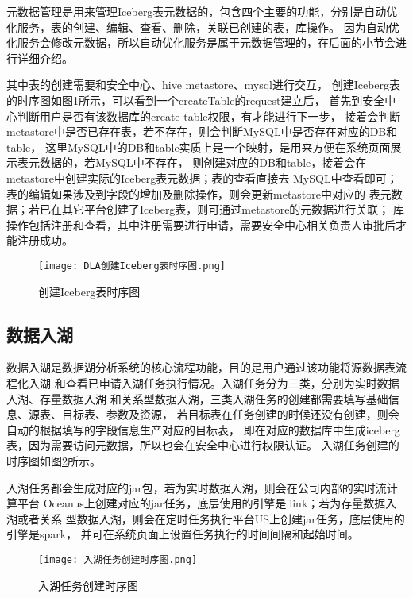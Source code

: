 元数据管理是用来管理Iceberg表元数据的，包含四个主要的功能，分别是自动优化服务，表的创建、编辑、查看、删除，关联已创建的表，库操作。
因为自动优化服务会修改元数据，所以自动优化服务是属于元数据管理的，在后面的小节会进行详细介绍。

其中表的创建需要和安全中心、hive metastore、mysql进行交互，
创建Iceberg表的时序图如图\ref{fig:创建Iceberg表时序图}所示，可以看到一个createTable的request建立后，
首先到安全中心判断用户是否有该数据库的create table权限，有才能进行下一步，
接着会判断metastore中是否已存在表，若不存在，则会判断MySQL中是否存在对应的DB和table，
这里MySQL中的DB和table实质上是一个映射，是用来方便在系统页面展示表元数据的，若MySQL中不存在，
则创建对应的DB和table，接着会在metastore中创建实际的Iceberg表元数据；表的查看直接去
MySQL中查看即可；表的编辑如果涉及到字段的增加及删除操作，则会更新metastore中对应的
表元数据；若已在其它平台创建了Iceberg表，则可通过metastore的元数据进行关联；
库操作包括注册和查看，其中注册需要进行申请，需要安全中心相关负责人审批后才能注册成功。

\begin{figure}[H]
  \centering
  \texttt{[image: DLA创建Iceberg表时序图.png]}
  \caption{创建Iceberg表时序图}
  \label{fig:创建Iceberg表时序图}
\end{figure}

\subsection{数据入湖}

数据入湖是数据湖分析系统的核心流程功能，目的是用户通过该功能将源数据表流程化入湖
和查看已申请入湖任务执行情况。入湖任务分为三类，分别为实时数据入湖、存量数据入湖
和关系型数据入湖，三类入湖任务的创建都需要填写基础信息、源表、目标表、参数及资源，
若目标表在任务创建的时候还没有创建，则会自动的根据填写的字段信息生产对应的目标表，
即在对应的数据库中生成iceberg表，因为需要访问元数据，所以也会在安全中心进行权限认证。
入湖任务创建的时序图如图\ref{fig:入湖任务创建时序图}所示。

入湖任务都会生成对应的jar包，若为实时数据入湖，则会在公司内部的实时流计算平台
Oceanus上创建对应的jar任务，底层使用的引擎是flink；若为存量数据入湖或者关系
型数据入湖，则会在定时任务执行平台US上创建jar任务，底层使用的引擎是spark，
并可在系统页面上设置任务执行的时间间隔和起始时间。

\begin{figure}[H]
  \centering
  \texttt{[image: 入湖任务创建时序图.png]}
  \caption{入湖任务创建时序图}
  \label{fig:入湖任务创建时序图}
\end{figure}

